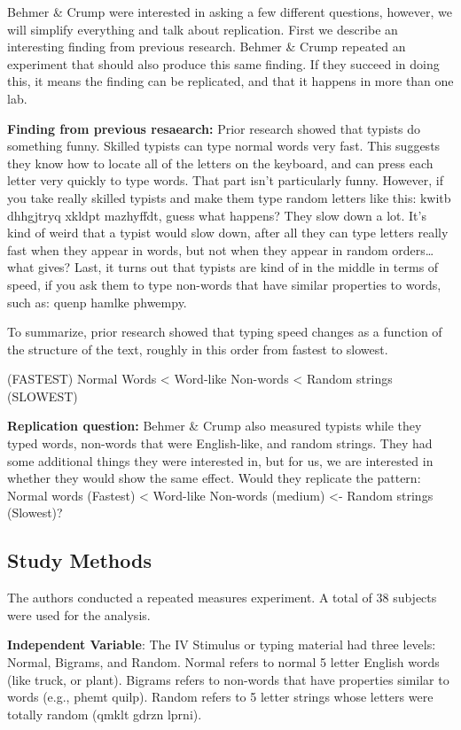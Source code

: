 \documentclass[
]{book}
\begin{document}
Behmer \& Crump were interested in asking a few different questions, however, we will simplify everything and talk about replication. First we describe an interesting finding from previous research. Behmer \& Crump repeated an experiment that should also produce this same finding. If they succeed in doing this, it means the finding can be replicated, and that it happens in more than one lab.

\textbf{Finding from previous resaearch:} Prior research showed that typists do something funny. Skilled typists can type normal words very fast. This suggests they know how to locate all of the letters on the keyboard, and can press each letter very quickly to type words. That part isn't particularly funny. However, if you take really skilled typists and make them type random letters like this: kwitb dhhgjtryq xkldpt mazhyffdt, guess what happens? They slow down a lot. It's kind of weird that a typist would slow down, after all they can type letters really fast when they appear in words, but not when they appear in random orders\ldots what gives? Last, it turns out that typists are kind of in the middle in terms of speed, if you ask them to type non-words that have similar properties to words, such as: quenp hamlke phwempy.

To summarize, prior research showed that typing speed changes as a function of the structure of the text, roughly in this order from fastest to slowest.

(FASTEST) Normal Words \textless{} Word-like Non-words \textless{} Random strings (SLOWEST)

\textbf{Replication question:} Behmer \& Crump also measured typists while they typed words, non-words that were English-like, and random strings. They had some additional things they were interested in, but for us, we are interested in whether they would show the same effect. Would they replicate the pattern: Normal words (Fastest) \textless{} Word-like Non-words (medium) \textless- Random strings (Slowest)?

\hypertarget{study-methods-1}{%
\subsection{Study Methods}\label{study-methods-1}}

The authors conducted a repeated measures experiment. A total of 38 subjects were used for the analysis.

\textbf{Independent Variable}: The IV Stimulus or typing material had three levels: Normal, Bigrams, and Random. Normal refers to normal 5 letter English words (like truck, or plant). Bigrams refers to non-words that have properties similar to words (e.g., phemt quilp). Random refers to 5 letter strings whose letters were totally random (qmklt gdrzn lprni).
\end{document}
